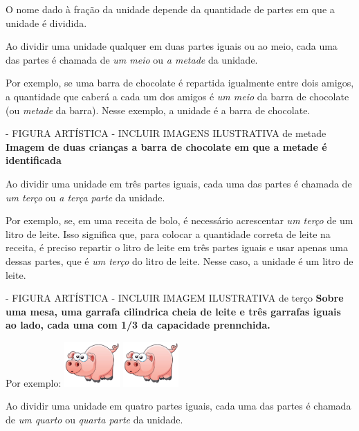 \documentclass[a4,12pt]{book}
\begin{document}
O nome dado à fração da unidade depende da quantidade de partes em que a unidade é dividida.

Ao dividir uma unidade qualquer em duas partes iguais ou ao meio, cada uma das partes é chamada de {\it um meio} ou {\it a metade} da unidade.

Por exemplo, se uma barra de chocolate é repartida igualmente entre dois amigos, a quantidade que caberá a cada um dos amigos é {\it um meio} da barra de chocolate (ou {\it metade} da barra). Nesse exemplo, a unidade é a barra de chocolate.

\begin{imagem*}[breakable]{}{}   - FIGURA ARTÍSTICA - INCLUIR IMAGENS ILUSTRATIVA de metade
  {\bf Imagem de duas crianças a barra de chocolate em que a metade é identificada}
\end{imagem*}

Ao dividir uma unidade em três partes iguais, cada uma das partes é chamada de {\it um terço} ou {\it a terça parte} da unidade.

Por exemplo, se, em uma receita de bolo, é necessário acrescentar {\it um terço} de um litro de leite. Isso significa que, para colocar a quantidade correta de leite na receita, é preciso repartir o litro de leite em três partes iguais e usar apenas uma dessas partes, que é {\it um terço} do litro de leite. Nesse caso, a unidade é um litro de leite.

\begin{imagem*}[breakable]{}{}   - FIGURA ARTÍSTICA - INCLUIR IMAGEM ILUSTRATIVA de terço
  {\bf Sobre uma mesa, uma garrafa cilindrica cheia de leite e três garrafas iguais ao lado, cada uma com 1/3 da capacidade prennchida.}

  Por exemplo:
    \includegraphics[width=60pt, keepaspectratio]{pig}
    \includegraphics[width=60pt, keepaspectratio]{pig}

\end{imagem*}

Ao dividir uma unidade em quatro partes iguais, cada uma das partes é chamada de {\it um quarto} ou {\it quarta parte} da unidade.
\end{document}
